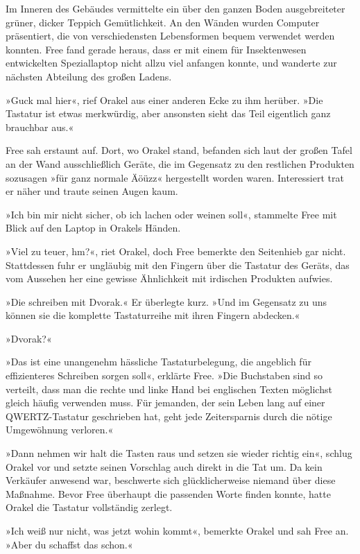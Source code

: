 Im Inneren des Gebäudes vermittelte ein über den ganzen Boden ausgebreiteter grüner, dicker Teppich Gemütlichkeit. An den Wänden wurden Computer präsentiert, die von verschiedensten Lebensformen bequem verwendet werden konnten. Free fand gerade heraus, dass er mit einem für Insektenwesen entwickelten Speziallaptop nicht allzu viel anfangen konnte, und wanderte zur nächsten Abteilung des großen Ladens.

»Guck mal hier«, rief Orakel aus einer anderen Ecke zu ihm herüber. »Die Tastatur ist etwas merkwürdig, aber ansonsten sieht das Teil eigentlich ganz brauchbar aus.«

Free sah erstaunt auf. Dort, wo Orakel stand, befanden sich laut der großen Tafel an der Wand ausschließlich Geräte, die im Gegensatz zu den restlichen Produkten sozusagen »für ganz normale Äöüzz« hergestellt worden waren. Interessiert trat er näher und traute seinen Augen kaum.

»Ich bin mir nicht sicher, ob ich lachen oder weinen soll«, stammelte Free mit Blick auf den Laptop in Orakels Händen.

»Viel zu teuer, hm?«, riet Orakel, doch Free bemerkte den Seitenhieb gar nicht. Stattdessen fuhr er ungläubig mit den Fingern über die Tastatur des Geräts, das vom Aussehen her eine gewisse Ähnlichkeit mit irdischen Produkten aufwies.

»Die schreiben mit Dvorak.« Er überlegte kurz. »Und im Gegensatz zu uns können sie die komplette Tastaturreihe mit ihren Fingern abdecken.«

»Dvorak?«

»Das ist eine unangenehm hässliche Tastaturbelegung, die angeblich für effizienteres Schreiben sorgen soll«, erklärte Free. »Die Buchstaben sind so verteilt, dass man die rechte und linke Hand bei englischen Texten möglichst gleich häufig verwenden muss. Für jemanden, der sein Leben lang auf einer QWERTZ-Tastatur geschrieben hat, geht jede Zeitersparnis durch die nötige Umgewöhnung verloren.«

»Dann nehmen wir halt die Tasten raus und setzen sie wieder richtig ein«, schlug Orakel vor und setzte seinen Vorschlag auch direkt in die Tat um. Da kein Verkäufer anwesend war, beschwerte sich glücklicherweise niemand über diese Maßnahme. Bevor Free überhaupt die passenden Worte finden konnte, hatte Orakel die Tastatur vollständig zerlegt.

»Ich weiß nur nicht, was jetzt wohin kommt«, bemerkte Orakel und sah Free an. »Aber du schaffst das schon.«

